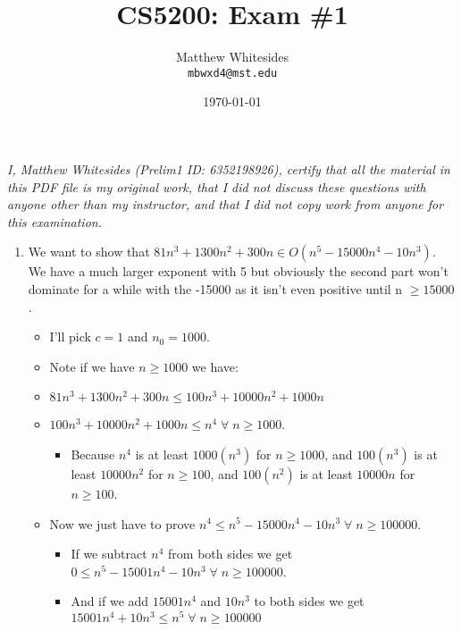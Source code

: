 \documentclass{article}
\title{CS5200: Exam \#1} %
\author{Matthew Whitesides\\ \texttt{mbwxd4@mst.edu}} %
\date{\today} %
\begin{document}
  \maketitle %
  
  \textit{I, Matthew Whitesides (Prelim1 ID: 6352198926), certify that all the material in this PDF file is my original work, that I did not discuss these questions with anyone other than my instructor, and that I did not copy work from anyone for this examination.}

  \begin{enumerate}
    \item We want to show that $81n^3 + 1300n^2 + 300n \in O(n^5 - 15000n^4 - 10n^3)$. \\
          We have a much larger exponent with 5 but obviously the second part won't dominate for a while with the -15000 as it isn't even positive until n $\ge 15000$.
    \begin{itemize}
       \item I'll pick $c = 1$ and $n_0 = 1000$.
       \item Note if we have $n \geq 1000$ we have:
       \item $81n^3 + 1300n^2 + 300n \le 100n^3 + 10000n^2 + 1000n$
       \item $100n^3 + 10000n^2 + 1000n \le n^4 \;\forall\; n \geq 1000$.
        \begin{itemize}
          \item Because $n^4$ is at least $1000(n^3)$ for $n \geq 1000$, and $100(n^3)$ is at least $10000n^2$ for $n \geq 100$, and $100(n^2)$ is at least $10000n$ for $n \geq 100$.
        \end{itemize}
        \item Now we just have to prove $n^4 \leq n^5 - 15000n^4 - 10n^3 \;\forall\; n \geq 100000$.
        \begin{itemize}
          \item If we subtract $n^4$ from both sides we get \\ $0 \leq n^5 - 15001n^4 - 10n^3 \;\forall\; n \geq 100000$.
          \item And if we add $15001n^4$ and $10n^3$ to both sides we get \\ $15001n^4 + 10n^3 \leq n^5 \;\forall\; n \geq 100000$
        \end{itemize}
    \end{itemize}
   
  \end{enumerate}  
  
\end{document}
